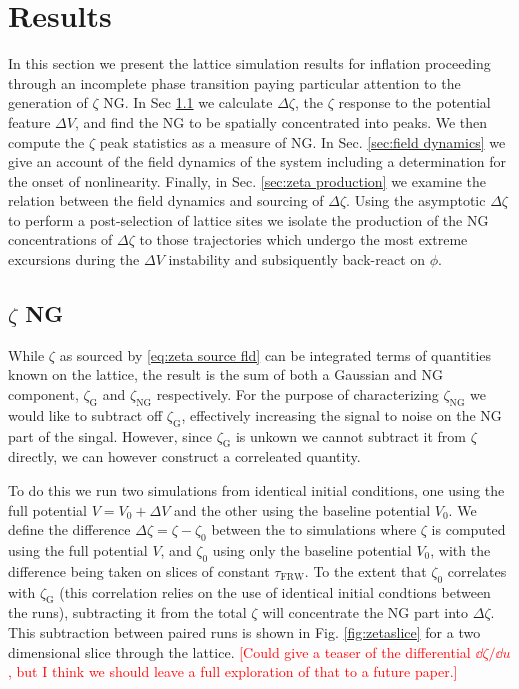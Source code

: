 
\section{Results} \label{sec:results}

In this section we present the lattice simulation results for inflation proceeding through an incomplete phase transition paying particular attention to the generation of $\zeta$ NG. In Sec \ref{sec:zeta ng} we calculate $\Delta\zeta$, the $\zeta$ response to the potential feature $\Delta V$, and find the NG to be spatially concentrated into peaks. We then compute the $\zeta$ peak statistics as a measure of NG. In Sec. \ref{sec:field dynamics} we give an account of the field dynamics of the system including a determination for the onset of nonlinearity. Finally, in Sec. \ref{sec:zeta production} we examine the relation between the field dynamics and sourcing of $\Delta\zeta$. Using the asymptotic $\Delta\zeta$ to perform a post-selection of lattice sites we isolate the production of the NG concentrations of $\Delta\zeta$ to those trajectories which undergo the most extreme excursions during the $\Delta V$ instability and subsiquently back-react on $\phi$.


\subsection{$\zeta$ NG} \label{sec:zeta ng}
While $\zeta$ as sourced by \eqref{eq:zeta source fld} can be integrated terms of quantities known on the lattice, the result is the sum of both a Gaussian and NG component, $\zeta_\mathrm{G}$ and $\zeta_\mathrm{NG}$ respectively. For the purpose of characterizing $\zeta_\mathrm{NG}$ we would like to subtract off $\zeta_\mathrm{G}$, effectively increasing the signal to noise on the NG part of the singal. However, since $\zeta_\mathrm{G}$ is unkown we cannot subtract it from $\zeta$ directly, we can however construct a correleated quantity.

To do this we run two simulations from identical initial conditions, one using the full potential $V=V_0+\Delta V$ and the other using the baseline potential $V_0$. We define the difference $\Delta\zeta=\zeta-\zeta_0$ between the to simulations where $\zeta$ is computed using the full potential $V$, and $\zeta_0$ using only the baseline potential $V_0$, with the difference being taken on slices of constant $\tau_\mathrm{FRW}$. To the extent that $\zeta_0$ correlates with $\zeta_\mathrm{G}$ (this correlation relies on the use of identical initial condtions between the runs), subtracting it from the total $\zeta$ will concentrate the NG part into $\Delta\zeta$. This subtraction between paired runs is shown in Fig. \ref{fig:zetaslice} for a two dimensional slice through the lattice. \textcolor{red}{[Could give a teaser of the differential $\dd\zeta/\dd u$, but I think we should leave a full exploration of that to a future paper.]}

